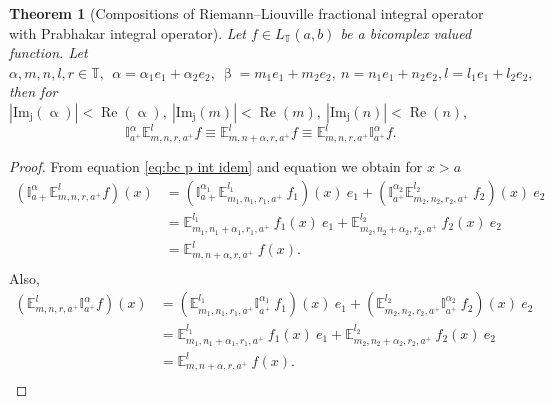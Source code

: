 \documentclass[a4paper,12pt]{article}
\newtheorem{theorem}{Theorem}[section]
\theoremstyle{remark}
\begin{document}
\begin{theorem}[Compositions of Riemann–Liouville fractional integral operator with Prabhakar integral operator]
	Let $f\in  L_{\mathbb{T}}(a, b)$ be a bicomplex valued function. Let $\alpha,m,n,l,r\in \mathbb{T},~ ~\alpha= \alpha_1e_1+\alpha_2e_2,  ~ \upbeta=m_1e_1+m_2e_2,~ n=n_1e_1+n_2e_2,l=l_1e_1+l_2e_2,$ then for $|\operatorname{Im_j}(\upalpha)|<\operatorname{Re}(\upalpha),~|\operatorname{Im_j}(m) |<\operatorname{Re}(m),~|\operatorname{Im_j}(n) |<\operatorname{Re}(n),$
	\begin{equation}
\mathbb{I}^{\alpha}_{a^+}\mathbb{E}^{l}_{m,n,r,a^+}f\equiv\mathbb{E}^{l}_{m,n+\alpha ,r,a^+}f\equiv\mathbb{E}^{l}_{m,n,r,a^+}	\mathbb{I}^{\alpha}_{a^+}f.
	\end{equation}
\end{theorem}
\begin{proof}
	From equation  \eqref{eq:bc p int idem} and   equation  \cite[Theorem 6,(5.1)]{kilbas1995fractional} we obtain
    for $x > a$ 
    \begin{equation}
    \begin{split}
    (	\mathbb{I}^{\alpha}_{a+}\mathbb{E}^{l}_{m,n,r,a^+}f)(x)&=(	\mathbb{I}^{\alpha_1}_{a+}\mathbb{E}^{l_1}_{m_1,n_1,r_1,a^+}~f_1)(x)~e_1+(	\mathbb{I}^{\alpha_2}_{a^+}\mathbb{E}^{l_2}_{m_2,n_2,r_2,a^+}~f_2)(x)~e_2\\
    &=\mathbb{E}^{l_1}_{m_1,n_1+\alpha_1 ,r_1,a^+}~f_1(x)~e_1+\mathbb{E}^{l_2}_{m_2,n_2+\alpha_2 ,r_2,a^+}~f_2(x)~e_2\\
    &=\mathbb{E}^{l}_{m,n+\alpha ,r,a^+}~f(x).\\
    \end{split}
    \end{equation}
    Also,
	\begin{equation}
    \begin{split}
    (	\mathbb{E}^{l}_{m,n,r,a^+}\mathbb{I}^{\alpha}_{a^+}f)(x)&=(	\mathbb{E}^{l_1}_{m_1,n_1,r_1,a^+}\mathbb{I}^{\alpha_1}_{a^+}~f_1)(x)~e_1+(	\mathbb{E}^{l_2}_{m_2,n_2,r_2,a^+}\mathbb{I}^{\alpha_2}_{a^+}~f_2)(x)~e_2\\
    &=\mathbb{E}^{l_1}_{m_1,n_1+\alpha_1 ,r_1,a^+}~f_1(x)~e_1+\mathbb{E}^{l_2}_{m_2,n_2+\alpha_2 ,r_2,a^+}~f_2(x)~e_2\\
    &=\mathbb{E}^{l}_{m,n+\alpha ,r,a^+}~f(x).\\
    \end{split}
    \end{equation}
    \end{proof}
\end{document}

